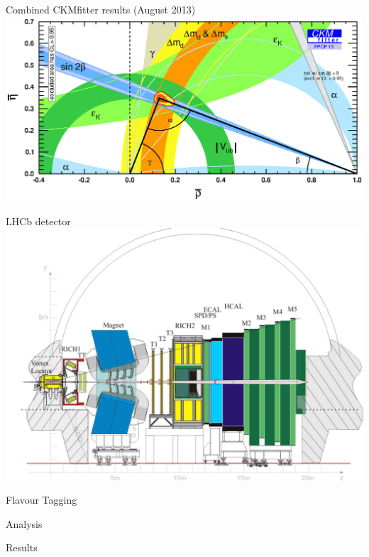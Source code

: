 \begin{frame}{Combined CKMfitter results (August 2013)}
  \centering
  \includegraphics[width=\textwidth]{figures/rhoeta_small_global.eps}
\end{frame}

\begin{frame}{LHCb detector}
  \includegraphics[width=\textwidth]{figures/lhcb.pdf}
\end{frame}


\begin{frame}{Flavour Tagging}
\end{frame}

\begin{frame}{Analysis}
\end{frame}

\begin{frame}{Results}
\end{frame}


